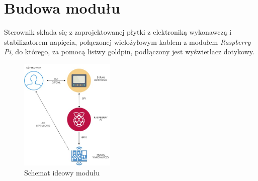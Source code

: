 \documentclass[12pt, eng, twoside, openany, final]{mgr}
\begin{document}
    \section{Budowa modułu}
    Sterownik składa się z zaprojektowanej płytki z elektroniką wykonawczą i stabilizatorem napięcia, połączonej wielożyłowym kablem z modułem \emph{Raspberry Pi}, do którego, za pomocą listwy goldpin, podłączony jest wyświetlacz dotykowy.
        \begin{figure}[H]
        \begin{center}
            \includegraphics[width=0.4\textwidth]{diagram.jpg}
            \caption{Schemat ideowy modułu}
        \end{center}
        \end{figure}
        
\end{document}
